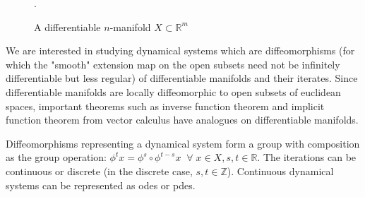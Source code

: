 \documentclass[11pt]{article}
\begin{document}
\begin{figure}[h!]
\caption{A differentiable $n$-manifold $X \subset \mathbb{R}^m$}.
\label{fig:manifold}
\end{figure}

We are interested in studying dynamical systems which are 
diffeomorphisms (for which 
the "smooth" extension
map on the open subsets need not be infinitely differentiable but less regular) of differentiable manifolds and their iterates. Since differentiable
manifolds are locally diffeomorphic to open subsets of euclidean spaces,
important theorems such as inverse function theorem and implicit function
theorem from vector calculus have analogues on differentiable manifolds. 


Diffeomorphisms
representing a dynamical system form a group with composition as the
group operation: $\phi^t x = \phi^s \circ \phi^{t-s} x\;\;\forall\; x \in X,
s,t \in \mathbb{R}$. The iterations can be 
continuous or discrete (in the discrete case, $s,t \in \mathbb{Z}$). Continuous dynamical systems can be represented as
odes or pdes.  
\end{document}
